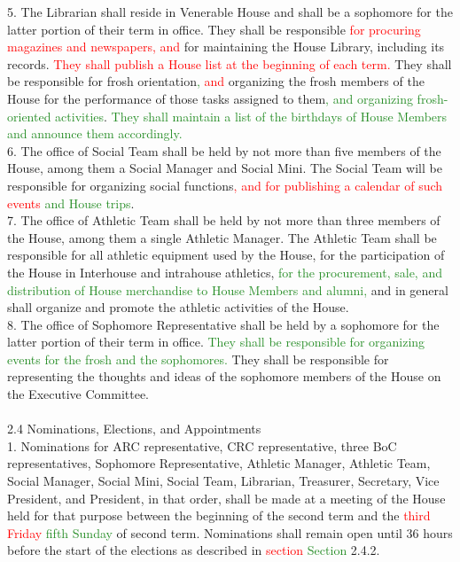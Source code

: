 \documentclass[10pt]{article} %
\newcommand{\add}[1]{\textcolor{ForestGreen}{#1}} %
\newcommand{\del}[1]{\textcolor{red}{#1}} %
\newcommand{\swap}[2]{\del{#1} \add{#2}} %
\begin{document}
\begin{itemize}
        5. The Librarian shall reside in Venerable House and shall be a sophomore for the latter portion of their term in office. They shall be responsible \del{for procuring magazines and newspapers, and} for maintaining the House Library, including its records. \del{They shall publish a House list at the beginning of each term.} They shall be responsible for frosh orientation\add{,} \del{and} organizing the frosh members of the House for the performance of those tasks assigned to them\add{, and organizing frosh-oriented activities}. \add{They shall maintain a list of the birthdays of House Members and announce them accordingly.} \\
        6. The office of Social Team shall be held by not more than five members of the House, among them a Social Manager and Social Mini. The Social Team will be responsible for organizing social functions\swap{, and for publishing a calendar of such events}{and House trips}. \\
        7. The office of Athletic Team shall be held by not more than three members of the House, among them a single Athletic Manager. The Athletic Team shall be responsible for all athletic equipment used by the House, for the participation of the House in Interhouse and intrahouse athletics, \add{for the procurement, sale, and distribution of House merchandise to House Members and alumni,} and in general shall organize and promote the athletic activities of the House. \\
        8. The office of Sophomore Representative shall be held by a sophomore for the latter portion of their term in office. \add{They shall be responsible for organizing events for the frosh and the sophomores.} They shall be responsible for representing the thoughts and ideas of the sophomore members of the House on the Executive Committee. \\ \\
        2.4 Nominations, Elections, and Appointments \\
        1. Nominations for ARC representative, CRC representative, three BoC representatives, Sophomore Representative, Athletic Manager, Athletic Team, Social Manager, Social Mini, Social Team, Librarian, Treasurer, Secretary, Vice President, and President, in that order, shall be made at a meeting of the House held for that purpose between the beginning of the second term and the \swap{third Friday}{fifth Sunday} of second term. Nominations shall remain open until 36 hours before the start of the elections as described in \swap{section}{Section} 2.4.2. \\

\end{itemize}
\end{document}
